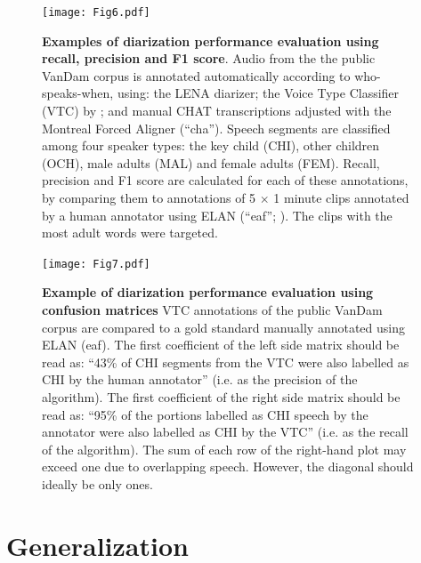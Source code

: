 \documentclass[smallextended]{svjour3}       %
\begin{document}
\begin{figure}[htb]

\centering
\texttt{[image: Fig6.pdf]}

\caption{\label{fig:precision}\textbf{Examples of diarization performance evaluation using recall, precision and F1 score}. Audio from the the public VanDam corpus \citep{vandam-day} is annotated automatically according to who-speaks-when, using: the LENA diarizer; the Voice Type Classifier (VTC) by \citet{lavechin2020opensource}; and manual CHAT transcriptions \citep{MacWhinney2000} adjusted with the Montreal Forced Aligner \citep{mfa} (``cha''). Speech segments are classified among four speaker types: the key child (CHI), other children (OCH), male adults (MAL) and female adults (FEM). Recall, precision and F1 score are calculated for each of these annotations, by comparing them to annotations of 5 $\times$ 1 minute clips annotated by a human annotator using ELAN (``eaf''; \citealt{wittenburg2006elan}). The clips with the most adult words were targeted.
}

\end{figure}


\begin{figure}[htb]

\centering
\texttt{[image: Fig7.pdf]}

\caption{\label{fig:confusion}\textbf{Example of diarization performance evaluation using confusion matrices}
VTC annotations of the public VanDam corpus \citep{vandam-day} are compared to a gold standard manually annotated using ELAN (eaf). The first coefficient of the left side matrix should be read as: ``43\% of CHI segments from the VTC were also labelled as CHI by the human annotator'' (i.e. as the precision of the algorithm). The first coefficient of the right side matrix should be read as: ``95\% of the portions labelled as CHI speech by the annotator were also labelled as CHI by the VTC'' (i.e. as the recall of the algorithm). The sum of each row of the right-hand plot may exceed one due to overlapping speech. However, the diagonal should ideally be only ones.
}

\end{figure}


\section{Generalization}
\end{document}
